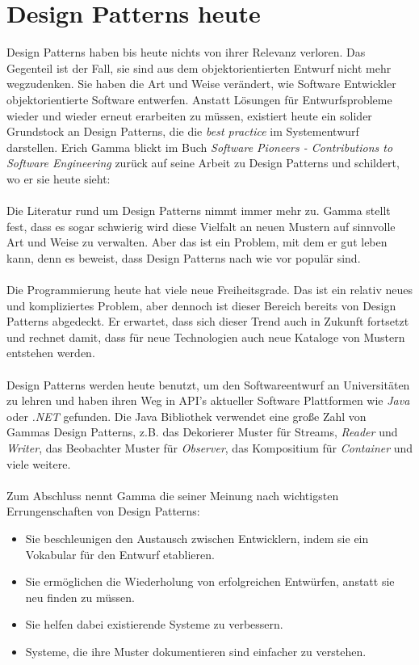 \documentclass[fontsize=11pt,a4paper,final]{scrreprt}[2003/01/01]
\begin{document}
\chapter{Design Patterns heute}\label{se:Design Patterns heute}
Design Patterns haben bis heute nichts von ihrer Relevanz verloren. Das Gegenteil ist der Fall, sie sind aus dem objektorientierten Entwurf nicht mehr wegzudenken. Sie haben die Art und Weise verändert, wie Software Entwickler objektorientierte Software entwerfen. Anstatt Lösungen für Entwurfsprobleme wieder und wieder erneut erarbeiten zu müssen, existiert heute ein solider Grundstock an Design Patterns, die die \textit{best practice} im Systementwurf darstellen. Erich Gamma blickt im Buch \textit{Software Pioneers - Contributions to Software Engineering} \cite[S. 688 - 700]{Broy2014} zurück auf seine Arbeit zu Design Patterns und schildert, wo er sie heute sieht: \\ \\
Die Literatur rund um Design Patterns nimmt immer mehr zu. Gamma stellt fest, dass es sogar schwierig wird diese Vielfalt an neuen Mustern auf sinnvolle Art und Weise zu verwalten. Aber das ist ein Problem, mit dem er gut leben kann, denn es beweist, dass Design Patterns nach wie vor populär sind. \\ \\
Die Programmierung heute hat viele neue Freiheitsgrade. Das ist ein relativ neues und kompliziertes Problem, aber dennoch ist dieser Bereich bereits von Design Patterns abgedeckt. Er erwartet, dass sich dieser Trend auch in Zukunft fortsetzt und rechnet damit, dass für neue Technologien auch neue Kataloge von Mustern entstehen werden. \\ \\
Design Patterns werden heute benutzt, um den Softwareentwurf an Universitäten zu lehren und haben ihren Weg in API's aktueller Software Plattformen wie \textit{Java} oder \textit{.NET} gefunden. Die Java Bibliothek verwendet eine große Zahl von Gammas Design Patterns, z.B. das Dekorierer Muster für Streams, \textit{Reader} und \textit{Writer}, das Beobachter Muster für \textit{Observer}, das Kompositium für \textit{Container} und viele weitere. \\ \\
Zum Abschluss nennt Gamma die seiner Meinung nach wichtigsten Errungenschaften von Design Patterns:
\begin{itemize}
	\item Sie beschleunigen den Austausch zwischen Entwicklern, indem sie ein Vokabular für den Entwurf etablieren.
	\item Sie ermöglichen die Wiederholung von erfolgreichen Entwürfen, anstatt sie neu finden zu müssen.
	\item Sie helfen dabei existierende Systeme zu verbessern.
	\item Systeme, die ihre Muster dokumentieren sind einfacher zu verstehen.
\end{itemize}
\newpage

\end{document}
